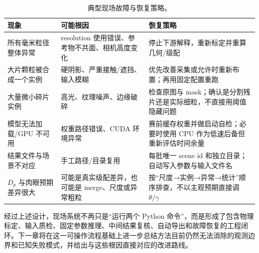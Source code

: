 \begin{table}[htbp]
\centering
\caption{典型现场故障与恢复策略。}
\label{tab:field-recovery}
\small
\renewcommand{\arraystretch}{1.15}
\begin{tabular}{>{\raggedright\arraybackslash}p{3.2cm}>{\raggedright\arraybackslash}p{4.4cm}>{\raggedright\arraybackslash}p{5.5cm}}
\toprule
现象 & 可能根因 & 恢复策略 \\
\midrule
所有毫米粒径整体异常 & resolution 使用错误、参考物不共面、相机高度变化 & 停止下游解释，重新标定并重算几何/级配 \\
大片颗粒被合成一个实例 & 硬阴影、严重接触/遮挡、输入模糊 & 优先改善采集或允许时重新布置；再用固定配置重跑 \\
大量微小碎片实例 & 高光、纹理噪声、边缘破碎 & 检查原图与 mask；确认是分割残片还是实际细粒，不直接用阈值隐藏问题 \\
模型无法加载/GPU 不可用 & 权重路径错误、CUDA 环境异常 & 赛前缓存权重并做启动自检；必要时使用 CPU 作为低速后备但重新评估时间余量 \\
结果文件与场景不对应 & 手工路径/目录复用 & 每批唯一 scene id 和独立目录；自动写入参数与输入文件名 \\
$D_p$ 与肉眼预期差异很大 & 可能是真实级配差异，也可能是 merge、尺度或异常粗粒 & 按“尺度→实例→异常→统计”顺序排查，不以主观预期直接调 $\theta/\gamma$ \\
\bottomrule
\end{tabular}
\end{table}

经过上述设计，现场系统不再只是“运行两个 Python 命令”，而是形成了包含物理标定、输入质检、固定参数推理、中间结果复核、自动导出和故障恢复的工程闭环。下一章将在这一可操作流程基础上进一步总结方法目前仍然无法消除的观测边界和已知失败模式，并给出与这些根因直接对应的改进路线。
